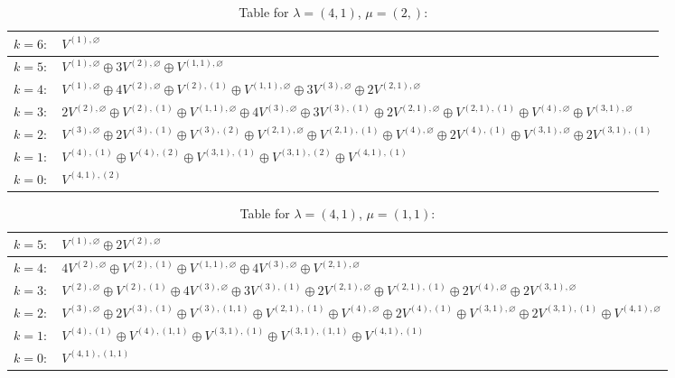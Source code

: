 \documentclass[a4paper,12pt]{article}
\begin{document}
\renewcommand{\arraystretch}{1.6} 
\begin{table}[H]
\centering
\caption{Table for $\lambda = (4, 1)$, $\mu = (2,)$:}
\begin{tabular}{|>{\centering\arraybackslash}p{15cm}|}
\hline
 $k = 6: \quad V^{(1), \varnothing} $ \\ \hline
 $k = 5: \quad V^{(1), \varnothing} \oplus 3 V^{(2), \varnothing} \oplus V^{(1, 1), \varnothing} $ \\ \hline
 $k = 4: \quad V^{(1), \varnothing} \oplus 4 V^{(2), \varnothing} \oplus V^{(2), (1)} \oplus V^{(1, 1), \varnothing} \oplus 3 V^{(3), \varnothing} \oplus 2 V^{(2, 1), \varnothing} $ \\ \hline
 $k = 3: \quad 2 V^{(2), \varnothing} \oplus V^{(2), (1)} \oplus V^{(1, 1), \varnothing} \oplus 4 V^{(3), \varnothing} \oplus 3 V^{(3), (1)} \oplus 2 V^{(2, 1), \varnothing} \oplus V^{(2, 1), (1)} \oplus V^{(4), \varnothing} \oplus V^{(3, 1), \varnothing} $ \\ \hline
 $k = 2: \quad V^{(3), \varnothing} \oplus 2 V^{(3), (1)} \oplus V^{(3), (2)} \oplus V^{(2, 1), \varnothing} \oplus V^{(2, 1), (1)} \oplus V^{(4), \varnothing} \oplus 2 V^{(4), (1)} \oplus V^{(3, 1), \varnothing} \oplus 2 V^{(3, 1), (1)} $ \\ \hline
 $k = 1: \quad V^{(4), (1)} \oplus V^{(4), (2)} \oplus V^{(3, 1), (1)} \oplus V^{(3, 1), (2)} \oplus V^{(4, 1), (1)} $ \\ \hline
 $k = 0: \quad V^{(4, 1), (2)} $ \\ \hline
\end{tabular}
\end{table}

\renewcommand{\arraystretch}{1.6} 
\begin{table}[H]
\centering
\caption{Table for $\lambda = (4, 1)$, $\mu = (1, 1)$:}
\begin{tabular}{|>{\centering\arraybackslash}p{15cm}|}
\hline
 $k = 5: \quad V^{(1), \varnothing} \oplus 2 V^{(2), \varnothing} $ \\ \hline
 $k = 4: \quad 4 V^{(2), \varnothing} \oplus V^{(2), (1)} \oplus V^{(1, 1), \varnothing} \oplus 4 V^{(3), \varnothing} \oplus V^{(2, 1), \varnothing} $ \\ \hline
 $k = 3: \quad V^{(2), \varnothing} \oplus V^{(2), (1)} \oplus 4 V^{(3), \varnothing} \oplus 3 V^{(3), (1)} \oplus 2 V^{(2, 1), \varnothing} \oplus V^{(2, 1), (1)} \oplus 2 V^{(4), \varnothing} \oplus 2 V^{(3, 1), \varnothing} $ \\ \hline
 $k = 2: \quad V^{(3), \varnothing} \oplus 2 V^{(3), (1)} \oplus V^{(3), (1, 1)} \oplus V^{(2, 1), (1)} \oplus V^{(4), \varnothing} \oplus 2 V^{(4), (1)} \oplus V^{(3, 1), \varnothing} \oplus 2 V^{(3, 1), (1)} \oplus V^{(4, 1), \varnothing} $ \\ \hline
 $k = 1: \quad V^{(4), (1)} \oplus V^{(4), (1, 1)} \oplus V^{(3, 1), (1)} \oplus V^{(3, 1), (1, 1)} \oplus V^{(4, 1), (1)} $ \\ \hline
 $k = 0: \quad V^{(4, 1), (1, 1)} $ \\ \hline
\end{tabular}
\end{table}
\end{document}
